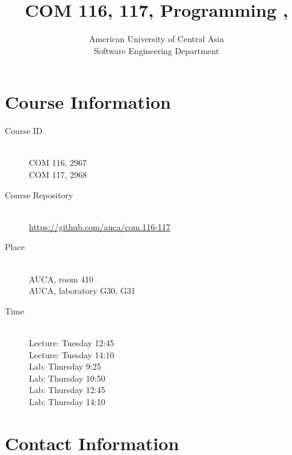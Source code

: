 \documentclass[12pt,a4paper,oneside]{article}
\newcommand{\R}[1]{\uppercase\expandafter{\romannumeral #1\relax}}
\begin{document}
    \title{COM 116, 117, Programming \R{1}, \R{2}}
    \author{
        American University of Central Asia\\
        Software Engineering Department
    }
    \date{}
    \maketitle

    \section{Course Information}

        \begin{description}
            \item[Course ID]\hfill\\
                COM 116, 2967\\
                COM 117, 2968
            \item[Course Repository]\hfill\\
                \url{https://github.com/auca/com.116-117}
            \item[Place]\hfill\\
                AUCA, room 410\\
                AUCA, laboratory G30, G31
            \item[Time]\hfill\\
                Lecture: Tuesday 12:45\\
                Lecture: Tuesday 14:10\\
                Lab: Thursday 9:25\\
                Lab: Thursday 10:50\\
                Lab: Thursday 12:45\\
                Lab: Thursday 14:10
        \end{description}

    \section{Contact Information}
\end{document}

